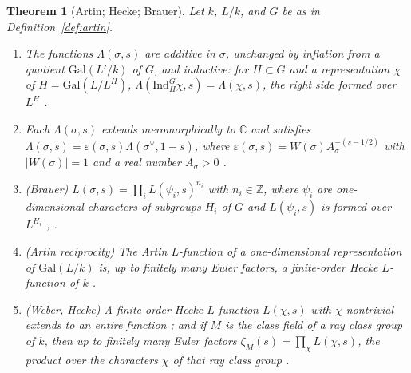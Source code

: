 \documentclass[11pt]{amsart}
\theoremstyle{plain}
\newtheorem{theorem}{Theorem}[section]
\theoremstyle{definition}
\theoremstyle{remark}
\numberwithin{equation}{section}
\newcommand{\C}{\mathbb{C}}
\newcommand{\Z}{\mathbb{Z}}
\begin{document}
\begin{theorem}[Artin; Hecke; Brauer]\label{thm:imp-artin}
Let $k$, $L/k$, and $G$ be as in Definition~\ref{def:artin}.
\begin{enumerate}[label=(\roman*)]
\item\label{item:art-formal} The functions $\Lambda(\sigma,s)$ are
  additive in $\sigma$, unchanged by inflation from a quotient
  $\mathrm{Gal}(L'/k)$ of $G$, and inductive: for $H\subset G$ and a
  representation $\chi$ of $H=\mathrm{Gal}(L/L^H)$,
  $\Lambda(\mathrm{Ind}_H^G\chi,s)=\Lambda(\chi,s)$, the right side
  formed over $L^H$ \cite[pp.~9, 12, and~13]{Cogdell2014ArtinLFunctions}.
\item\label{item:art-fe} Each $\Lambda(\sigma,s)$ extends
  meromorphically to $\C$ and satisfies
  $\Lambda(\sigma,s)=\varepsilon(\sigma,s)\Lambda(\sigma^\vee,1-s)$,
  where $\varepsilon(\sigma,s)=W(\sigma)A_\sigma^{-(s-1/2)}$ with
  $|W(\sigma)|=1$ and a real number $A_\sigma>0$
  \cite[pp.~10--11, 13, and~15]{Cogdell2014ArtinLFunctions}.
\item\label{item:art-brauer} (Brauer) $L(\sigma,s)=\prod_i
  L(\psi_i,s)^{n_i}$ with $n_i\in\Z$, where $\psi_i$ are one-dimensional
  characters of subgroups $H_i$ of $G$ and $L(\psi_i,s)$ is formed over
  $L^{H_i}$ \cite[pp.~10--11, (2)]{Cogdell2014ArtinLFunctions},
  \cite[Theorem~2, p.~7]{Kramar2005ArtinBrauer}.
\item\label{item:art-weber} (Artin reciprocity) The Artin
  $L$-function of a one-dimensional representation of $\mathrm{Gal}(L/k)$
  is, up to finitely many Euler factors, a finite-order Hecke
  $L$-function of $k$ \cite[p.~10]{Milne2020CFT}.
\item\label{item:art-hecke} (Weber, Hecke) A finite-order Hecke
  $L$-function $L(\chi,s)$ with $\chi$ nontrivial extends to an entire
  function \cite[p.~8]{Milne2020CFT}; and if $M$ is the class field of a
  ray class group of $k$, then up to finitely many Euler factors
  $\zeta_M(s)=\prod_\chi L(\chi,s)$, the product over the characters
  $\chi$ of that ray class group
  \cite[p.~4]{Cogdell2014ArtinLFunctions}.
\end{enumerate}
\end{theorem}
\end{document}
